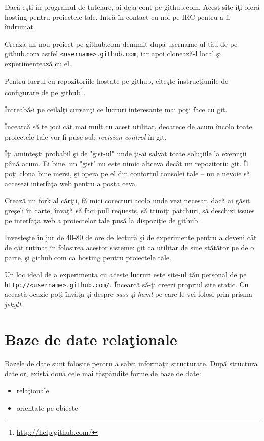 \begin{Exercise}[title={A taste of git}]
Dacă eşti în programul de tutelare, ai deja cont pe github.com.
Acest site îţi oferă hosting pentru proiectele tale. Intră
în contact cu noi pe IRC pentru a fi îndrumat.

Crează un nou proiect pe github.com denumit după username-ul tău
de pe github.com astfel \texttt{<username>.github.com}, iar apoi
clonează-l local şi experimentează cu el.

Pentru lucrul cu repozitoriile hostate pe github, citeşte instrucţiunile
de configurare de pe github\footnote{\url{http://help.github.com/}}.

Întreabă-i pe ceilalţi cursanţi ce lucruri interesante mai poţi face
cu git.

Încearcă să te joci cât mai mult cu acest utilitar, deoarece de acum
încolo toate proiectele tale vor fi puse sub \textsl{revision control} în git.

Îţi aminteşti probabil şi de "gist-ul" unde ţi-ai salvat toate soluţiile
la exerciţii până acum. Ei bine, un "gist" nu este nimic altceva decât
un repozitoriu git. Îl poţi clona bine mersi, şi opera pe el
din confortul consolei tale -- nu e nevoie să accesezi interfaţa
web pentru a posta ceva.

Crează un fork al cărţii, fă mici corecturi acolo unde vezi necesar,
dacă ai găsit greşeli în carte, învaţă să faci pull
requests, să trimiţi patchuri, să deschizi issues pe interfaţa web
a proiectelor tale pusă la dispoziţie de github.

Investeşte în jur de 40-80 de ore de lectură şi de experimente pentru
a deveni cât de cât rutinat în folosirea acestor sisteme: git
ca utilitar de sine stătător pe de o parte, şi github.com ca
hosting pentru proiectele tale.

Un loc ideal de a experimenta cu aceste lucruri este site-ul tău
personal de pe \texttt{http://<username>.github.com/}. Încearcă
să-ţi creezi propriul site static. Cu această ocazie poţi învăţa
şi despre \textsl{sass} şi \textsl{haml} pe care le vei folosi
prin prisma \textsl{jekyll}.
\end{Exercise}

\section{Baze de date relaţionale}
Bazele de date sunt folosite pentru a salva informaţii structurate.
După structura datelor, există două cele mai răspândite forme de
baze de date:
\begin{itemize}
\item relaţionale
\item orientate pe obiecte
\end{itemize}

